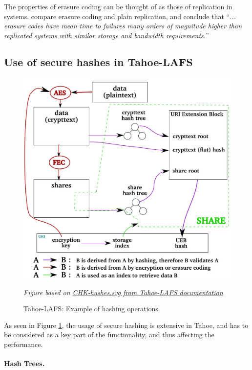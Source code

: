\documentclass[english,12pt,a4paper]{book}
\begin{document}
The properties of erasure coding can be thought of as those of replication in
 systems. \citet*{t_erasure} compare erasure coding and plain
replication, and conclude that ``\emph{...  erasure codes have mean time to
failures many orders of magnitude higher than replicated systems with similar
storage and bandwidth requirements.}''

\subsection{Use of secure hashes in Tahoe-LAFS}

\begin{figure}[!h]
    \centering
    \includegraphics[width=0.9\columnwidth]{Tahoe-hashes.pdf}
    \caption{Tahoe-LAFS: Example of hashing operations.}
    \label{fig:tahoehashing}
    \emph{Figure based on
     \href{http://tahoe-lafs.org/source/tahoe/trunk/docs/specifications/CHK-hashes.svg}
     {CHK-hashes.svg from Tahoe-LAFS documentation}}
\end{figure}

As seen in Figure \ref{fig:tahoehashing}, the usage of secure hashing is
extensive in Tahoe, and has to be considered as a key part of the functionality,
and thus affecting the performance.

\paragraph{Hash Trees.}
\end{document}
